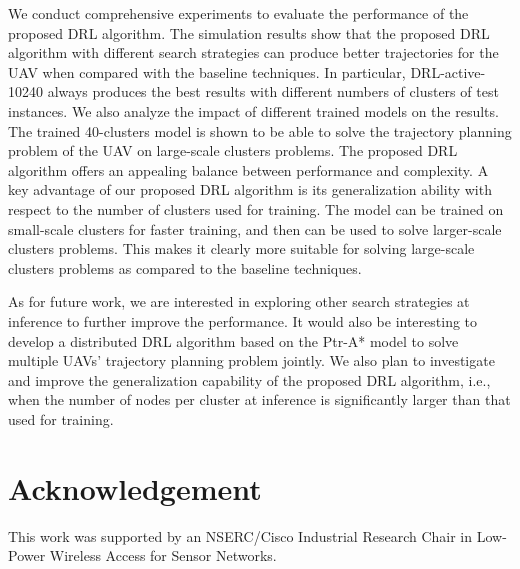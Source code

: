 \documentclass[journal]{IEEEtran}
\begin{document}
We conduct comprehensive experiments to evaluate the performance of the proposed DRL algorithm. The simulation results show that the proposed DRL algorithm with different search strategies can produce better trajectories for the UAV when compared with the baseline techniques. In particular, DRL-active-10240 always produces the best results with different numbers of clusters of test instances. We also analyze the impact of different trained models on the results. The trained 40-clusters model is shown to be able to solve the trajectory planning problem of the UAV on large-scale clusters problems. The proposed DRL algorithm offers an appealing balance between performance and complexity. A key advantage of our proposed DRL algorithm is its generalization ability with respect to the number of clusters used for training. The model can be trained on small-scale clusters for faster training, and then can be used to solve larger-scale clusters problems. This makes it clearly more suitable for solving large-scale clusters problems as compared to the baseline techniques. 

As for future work, we are interested in exploring other search strategies at inference to further improve the performance. It would also be interesting to develop a distributed DRL algorithm based on the Ptr-A* model to solve multiple UAVs' trajectory planning problem jointly. We also plan to investigate and improve the generalization capability of the proposed DRL algorithm, i.e., when the number of nodes per cluster at inference is significantly larger than that used for training.

\section*{Acknowledgement}

This work was supported by an NSERC/Cisco Industrial Research Chair in Low-Power Wireless Access for Sensor Networks.
\end{document}
